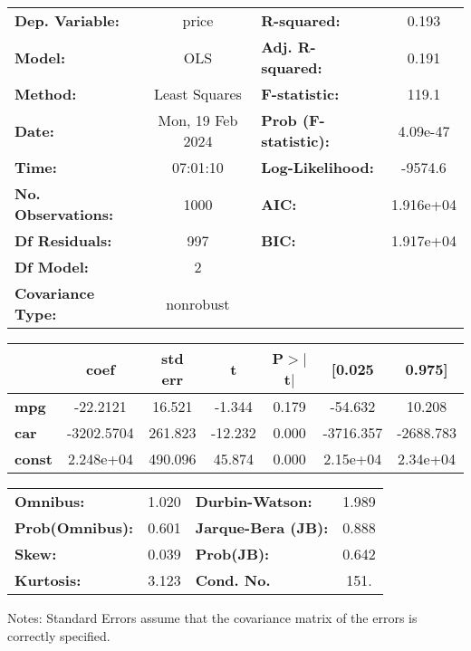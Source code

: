 \begin{center}
\begin{tabular}{lclc}
\toprule
\textbf{Dep. Variable:}    &      price       & \textbf{  R-squared:         } &     0.193   \\
\textbf{Model:}            &       OLS        & \textbf{  Adj. R-squared:    } &     0.191   \\
\textbf{Method:}           &  Least Squares   & \textbf{  F-statistic:       } &     119.1   \\
\textbf{Date:}             & Mon, 19 Feb 2024 & \textbf{  Prob (F-statistic):} &  4.09e-47   \\
\textbf{Time:}             &     07:01:10     & \textbf{  Log-Likelihood:    } &   -9574.6   \\
\textbf{No. Observations:} &        1000      & \textbf{  AIC:               } & 1.916e+04   \\
\textbf{Df Residuals:}     &         997      & \textbf{  BIC:               } & 1.917e+04   \\
\textbf{Df Model:}         &           2      & \textbf{                     } &             \\
\textbf{Covariance Type:}  &    nonrobust     & \textbf{                     } &             \\
\bottomrule
\end{tabular}
\begin{tabular}{lcccccc}
               & \textbf{coef} & \textbf{std err} & \textbf{t} & \textbf{P$> |$t$|$} & \textbf{[0.025} & \textbf{0.975]}  \\
\midrule
\textbf{mpg}   &     -22.2121  &       16.521     &    -1.344  &         0.179        &      -54.632    &       10.208     \\
\textbf{car}   &   -3202.5704  &      261.823     &   -12.232  &         0.000        &    -3716.357    &    -2688.783     \\
\textbf{const} &    2.248e+04  &      490.096     &    45.874  &         0.000        &     2.15e+04    &     2.34e+04     \\
\bottomrule
\end{tabular}
\begin{tabular}{lclc}
\textbf{Omnibus:}       &  1.020 & \textbf{  Durbin-Watson:     } &    1.989  \\
\textbf{Prob(Omnibus):} &  0.601 & \textbf{  Jarque-Bera (JB):  } &    0.888  \\
\textbf{Skew:}          &  0.039 & \textbf{  Prob(JB):          } &    0.642  \\
\textbf{Kurtosis:}      &  3.123 & \textbf{  Cond. No.          } &     151.  \\
\bottomrule
\end{tabular}
\end{center}

Notes: \newline
 [1] Standard Errors assume that the covariance matrix of the errors is correctly specified.
